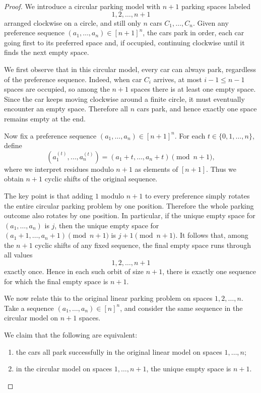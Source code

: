 \documentclass[11pt, a4paper]{ctexrep}
\begin{document}
\begin{proof}
    We introduce a circular parking model with $n+1$ parking spaces labeled
    \[
        1,2,\dots,n+1
    \]
    arranged clockwise on a circle, and still only $n$ cars $C_1,\dots,C_n$.
    Given any preference sequence $(a_1,\dots,a_n)\in [n+1]^n$, the cars park in order, each car going first to its preferred space and, if occupied, continuing clockwise until it finds the next empty space.

    We first observe that in this circular model, every car can always park, regardless of the preference sequence. Indeed, when car $C_i$ arrives, at most $i-1\le n-1$ spaces are occupied, so among the $n+1$ spaces there is at least one empty space. Since the car keeps moving clockwise around a finite circle, it must eventually encounter an empty space. Therefore all $n$ cars park, and hence exactly one space remains empty at the end.

    Now fix a preference sequence $(a_1,\dots,a_n)\in [n+1]^n$. For each $t\in\{0,1,\dots,n\}$, define
    \[
        (a_1^{(t)},\dots,a_n^{(t)})=(a_1+t,\dots,a_n+t)\pmod{n+1},
    \]
    where we interpret residues modulo $n+1$ as elements of $[n+1]$.
    Thus we obtain $n+1$ cyclic shifts of the original sequence.

    The key point is that adding $1$ modulo $n+1$ to every preference simply rotates the entire circular parking problem by one position. Therefore the whole parking outcome also rotates by one position. In particular, if the unique empty space for $(a_1,\dots,a_n)$ is $j$, then the unique empty space for $(a_1+1,\dots,a_n+1)\pmod{n+1}$ is $j+1 \pmod{n+1}$. It follows that, among the $n+1$ cyclic shifts of any fixed sequence, the final empty space runs through all values
    \[
        1,2,\dots,n+1
    \]
    exactly once. Hence in each such orbit of size $n+1$, there is exactly one sequence for which the final empty space is $n+1$.

    We now relate this to the original linear parking problem on spaces $1,2,\dots,n$.
    Take a sequence $(a_1,\dots,a_n)\in [n]^n$, and consider the same sequence in the circular model on $n+1$ spaces.

    We claim that the following are equivalent:
    \begin{enumerate}
        \item the cars all park successfully in the original linear model on spaces $1,\dots,n$;
        \item in the circular model on spaces $1,\dots,n+1$, the unique empty space is $n+1$.
    \end{enumerate}


\end{proof}
\end{document}
